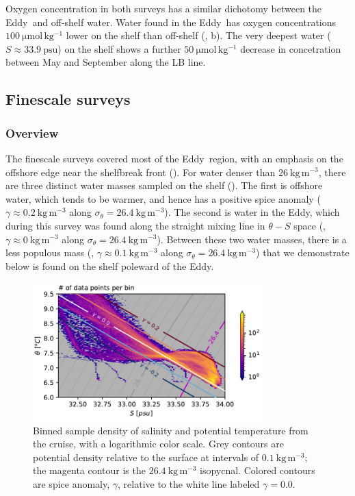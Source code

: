 \documentclass[draft]{agujournal2019}
\newcommand*{\Eddy}{{\sc Eddy}}
\begin{document}
Oxygen concentration in both surveys has a similar dichotomy between the \Eddy\ and off-shelf water.  Water found in the \Eddy\ has oxygen concentrations $100\ \mathrm{\mu mol\, kg^{-1}}$ lower on the shelf than off-shelf (, b).  The very deepest water ($S\approx 33.9\ \mathrm{psu}$) on the shelf shows a further $50\ \mathrm{\mu mol\, kg^{-1}}$ decrease in concetration between May and September along the LB line.

\subsection{Finescale surveys}

\subsubsection{Overview}

The finescale surveys covered most of the \Eddy\ region, with an emphasis on the offshore edge near the shelfbreak front ().  For water denser than $26\ \mathrm{kg\,m^{-3}}$, there are three distinct water masses sampled on the shelf ().  The first is offshore water, which tends to be warmer, and hence has a positive spice anomaly ($\gamma \approx 0.2\ \mathrm{kg\,m^{-3}}$ along $\sigma_{\theta} = 26.4\ \mathrm{kg\,m^{-3}}$).  The second is water in the \Eddy, which during this survey was found along the straight mixing line in $\theta-S$ space (, $\gamma \approx 0\ \mathrm{kg\,m^{-3}}$ along $\sigma_{\theta} = 26.4\ \mathrm{kg\,m^{-3}}$).  Between these two water masses, there is a less populous mass (, $\gamma \approx 0.1\ \mathrm{kg\,m^{-3}}$ along $\sigma_{\theta} = 26.4\ \mathrm{kg\,m^{-3}}$) that we demonstrate below is found on the shelf poleward of the \Eddy.

\begin{figure}[htbp]
  \begin{center}
     \includegraphics[width=3.5in]{TSdensSpice.pdf}
    \caption{Binned sample density of salinity and potential temperature from the cruise, with a logarithmic color scale.  Grey contours are potential density relative to the surface at intervals of $0.1\ \mathrm{kg\,m^{-3}}$; the magenta contour is the $26.4\ \mathrm{kg\,m^{-3}}$ isopycnal.  Colored contours are spice anomaly, $\gamma$, relative to the white line labeled $\gamma=0.0$.
    \label{fig:TSdensSpice}}
  \end{center}
\end{figure}
\end{document}
